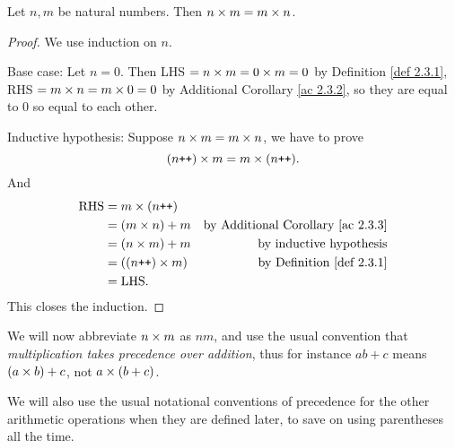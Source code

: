\begin{lemma}\label{lem 2.3.2}
Let \(n, m\) be natural numbers. Then \(n \times m = m \times n\).
\end{lemma}
\begin{proof}
We use induction on \(n\).

Base case: Let \(n = 0\). Then LHS \(= n \times m = 0 \times m = 0\) by Definition \ref{def 2.3.1}, RHS \(= m \times n = m \times 0 = 0\) by Additional Corollary \ref{ac 2.3.2}, so they are equal to \(0\) so equal to each other.

Inductive hypothesis: Suppose \(n \times m = m \times n\), we have to prove
\[(n\texttt{++}) \times m = m \times (n\texttt{++}).\]
And
\begin{align*}
    \text{RHS} & = m \times (n\texttt{++}) \\
               & = (m \times n) + m & \text{by Additional Corollary \ref{ac 2.3.3}} \\
               & = (n \times m) + m & \text{by inductive hypothesis} \\
               & = ((n\texttt{++}) \times m) & \text{by Definition \ref{def 2.3.1}} \\
               & = \text{LHS.}
\end{align*}
This closes the induction.
\end{proof}

\begin{note}
We will now abbreviate \(n \times m\) as \(nm\), and use the usual convention that \emph{multiplication takes precedence over addition}, thus for instance \(ab + c\) means \((a \times b)+ c\), not \(a \times (b + c)\).

We will also use the usual notational conventions of precedence for the other arithmetic operations when they are defined later, to save on using parentheses all the time.
\end{note}

